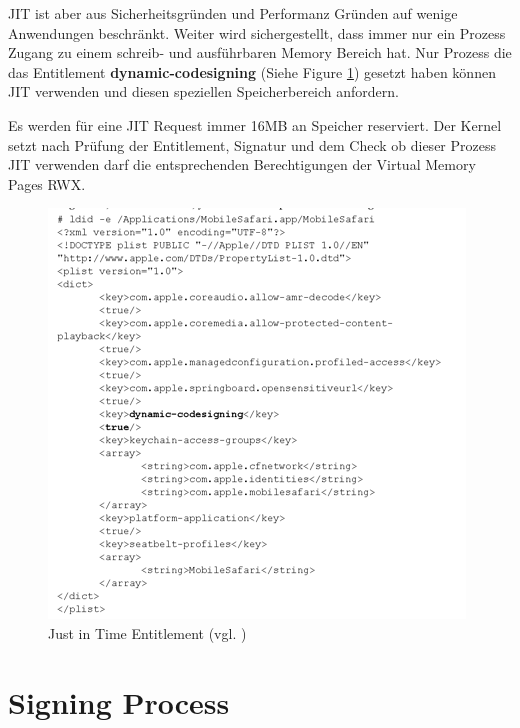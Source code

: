 JIT ist aber aus Sicherheitsgründen und Performanz Gründen auf wenige Anwendungen beschränkt. Weiter wird sichergestellt, dass immer nur ein Prozess Zugang zu einem schreib- und ausführbaren Memory Bereich hat. Nur Prozess die das Entitlement \textbf{dynamic-codesigning} (Siehe Figure \ref{fig:JIT}) gesetzt haben können JIT verwenden und diesen speziellen Speicherbereich anfordern.

Es werden für eine JIT Request immer 16MB an Speicher reserviert. Der Kernel setzt nach Prüfung der Entitlement, Signatur und dem Check ob dieser Prozess JIT verwenden darf die entsprechenden Berechtigungen der Virtual Memory Pages RWX.

\begin{figure}[!ht]
        \centering
                \includegraphics[scale=0.8]{JIT}
        \caption{Just in Time Entitlement (vgl. \cite{Hacking[1]}) }
        \label{fig:JIT}
\end{figure}
\section{Signing Process}
\label{sec:SigningProcess}


